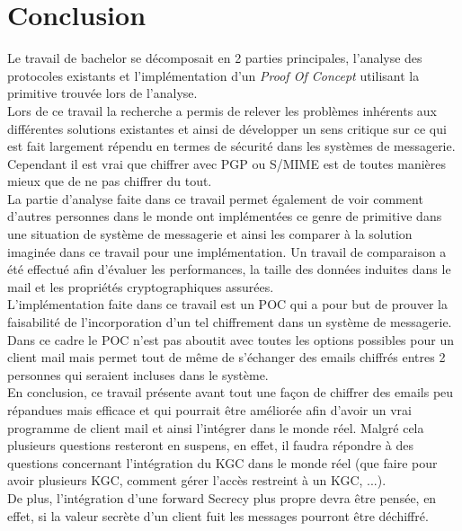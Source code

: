\chapter{Conclusion}
\label{ch:conclusion}
Le travail de bachelor se décomposait en 2 parties principales, l'analyse des protocoles existants et l'implémentation d'un \textit{Proof Of Concept} utilisant la primitive trouvée lors de l'analyse.\\
Lors de ce travail la recherche a permis de relever les problèmes inhérents aux différentes solutions existantes et ainsi de développer un sens critique sur ce qui est fait largement répendu en termes de sécurité dans les systèmes de messagerie. Cependant il est vrai que chiffrer avec PGP ou S/MIME est de toutes manières mieux que de ne pas chiffrer du tout.\\
La partie d'analyse faite dans ce travail permet également de voir comment d'autres personnes dans le monde ont implémentées ce genre de primitive dans une situation de système de messagerie et ainsi les comparer à la solution imaginée dans ce travail pour une implémentation. Un travail de comparaison a été effectué afin d'évaluer les performances, la taille des données induites dans le mail et les propriétés cryptographiques assurées.\\
L'implémentation faite dans ce travail est un POC qui a pour but de prouver la faisabilité de l'incorporation d'un tel chiffrement dans un système de messagerie. Dans ce cadre le POC n'est pas aboutit avec toutes les options possibles pour un client mail mais permet tout de même de s'échanger des emails chiffrés entres 2 personnes qui seraient incluses dans le système.\\
En conclusion, ce travail présente avant tout une façon de chiffrer des emails peu répandues mais efficace et qui pourrait être améliorée afin d'avoir un vrai programme de client mail et ainsi l'intégrer dans le monde réel. Malgré cela plusieurs questions resteront en suspens, en effet, il faudra répondre à des questions concernant l'intégration du KGC dans le monde réel (que faire pour avoir plusieurs KGC, comment gérer l'accès restreint à un KGC, ...).\\
De plus, l'intégration d'une forward Secrecy plus propre devra être pensée, en effet, si la valeur secrète d'un client fuit les messages pourront être déchiffré.